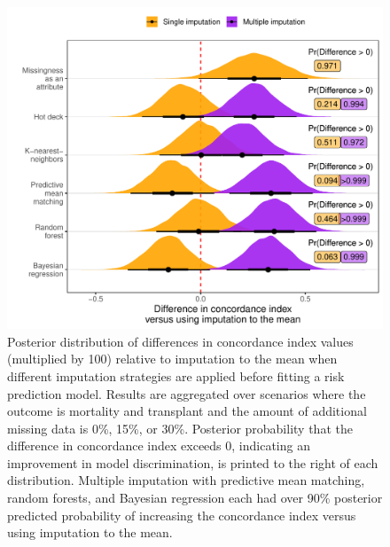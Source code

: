 \documentclass{article}
\begin{document}
\begin{figure}

{\centering \includegraphics{doc_arxiv_files/figure-latex/fig_md_strat_infer_auc-1} 

}

\caption{Posterior distribution of differences in concordance index values (multiplied by 100) relative to imputation to the mean when different imputation strategies are applied before fitting a risk prediction model. Results are aggregated over scenarios where the outcome is mortality and transplant and the amount of additional missing data is 0\%, 15\%, or 30\%. Posterior probability that the difference in concordance index exceeds 0, indicating an improvement in model discrimination, is printed to the right of each distribution. Multiple imputation with predictive mean matching, random forests, and Bayesian regression each had over 90\% posterior predicted probability of increasing the concordance index versus using imputation to the mean.}\label{fig:fig_md_strat_infer_auc}
\end{figure}

\clearpage
\end{document}

